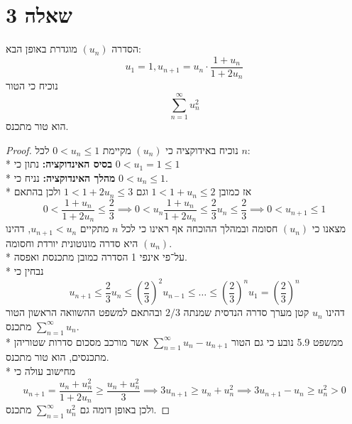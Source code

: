 \section{שאלה 3}
הסדרה $(u_n)$ מוגדרת באופן הבא:
\[
	u_1 = 1, u_{n + 1} = u_n \cdot \frac{1 + u_n}{1 + 2u_n}
\]
נוכיח כי הטור
\[
	\sum_{n = 1}^{\infty} u_n^2
\]
הוא טור מתכנס.
\begin{proof}
	נוכיח באידוקציה כי $(u_n)$ מקיימת $0 < u_n \le 1$ לכל $n$: \\*
	\textbf{בסיס האינדוקציה:}
	נתון כי $0 < u_1 = 1 \le 1$ \\*
	\textbf{מהלך האינדוקציה:}
	נניח כי $0 < u_n \le 1$. \\*
	אז כמובן $1 < 1 + u_n \le 2$ וגם $1 < 1 + 2u_n \le 3$ ולכן בהתאם
	\[
		0 < \frac{1 + u_n}{1 + 2u_n} \le \frac{2}{3}
		\implies 0 < u_n \frac{1 + u_n}{1 + 2u_n} \le \frac{2}{3} u_n \le \frac{2}{3}
		\implies 0 < u_{n + 1} \le 1
	\]
	מצאנו כי $(u_n)$ חסומה ובמהלך ההוכחה אף ראינו כי לכל $n$ מתקיים $u_{n + 1} < u_n$, דהינו $(u_n)$ היא סדרה מונוטונית יורדת וחסומה. \\*
	על־פי אינפי 1 הסדרה כמובן מתכנסת ואפסה. \\*
	נבחין כי 
	\[
		u_{n + 1} \le \frac{2}{3} u_n \le {(\frac{2}{3})}^2 u_{n - 1} \le \dots \le {(\frac{2}{3})}^n u_1 = {(\frac{2}{3})}^n
	\]
	דהינו $u_n$ קטן מערך סדרה הנדסית שמנתה $2/3$ ובהתאם למשפט ההשוואה הראשון הטור $\sum_{n = 1}^{\infty} u_n$ מתכנס. \\*
	ממשפט 5.9 נובע כי גם הטור $\sum_{n = 1}^{\infty} u_n - u_{n + 1}$ אשר מורכב מסכום סדרות שטוריהן מתכנסים, הוא טור מתכנס. \\*
	מחישוב עולה כי
	\[
		u_{n + 1}
		= \frac{u_n + u_n^2}{1 + 2u_n}
		\ge \frac{u_n + u_n^2}{3}
		\implies 3u_{n + 1} \ge u_n + u_n^2
		\implies 3u_{n + 1} - u_n \ge u_n^2 > 0
	\]
	ולכן באופן דומה גם $\sum_{n = 1}^{\infty} u_n^2$ מתכנס.
\end{proof}

